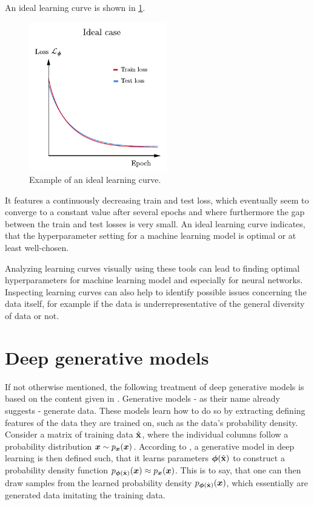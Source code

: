\documentclass[a4paper,11pt]{report}
\def\lk#1{{\color{black}{#1}}}
\begin{document}
An ideal learning curve is shown in \cref{fig:ideallearningcurve}.
\begin{figure}[h]
\centering
\includegraphics[width=6cm]{figures/ideallearningcurve.pdf}
\caption{Example of an ideal learning curve.}
\label{fig:ideallearningcurve}
\end{figure}
It features a continuously decreasing train and test loss, which eventually seem to converge to a constant value after several epochs and where furthermore the gap between the train and test losses is very small. An ideal learning curve indicates, that the hyperparameter setting for a machine learning model is optimal or at least well-chosen.

Analyzing learning curves visually using these tools can lead to finding optimal hyperparameters for machine learning model\lk{s} and especially for neural networks. Inspecting learning curves can also help to identify possible issues concerning the data itself, for example if the \lk{training or testing} data is underrepresentative of the general diversity of data or not.

\section{Deep generative models}
If not otherwise mentioned, the following treatment of deep generative models is based on the content given in \cite{weng2018flow}. Generative models - as their name already suggests - generate data. These models learn how to do so by extracting defining features of the data they are trained on, such as the data's probability density. Consider a matrix of training data $\hat{\boldsymbol{\mathbf{x}}}$, where the individual columns follow a probability distribution $\bm{x} \sim p_{\bm{x}}(\bm{x})$. According to \cite[p.593]{Raschka.2022}, a generative model in deep learning is then defined such, that it learns parameters $\bm{\phi}(\hat{\boldsymbol{\mathbf{x}}})$ to construct a probability density function $p_{\bm{\phi}(\hat{\boldsymbol{\mathbf{x}}})}(\bm{x}) \approx p_{\bm{x}}(\bm{x})$. This is to say, that one can then draw samples from the learned probability density $p_{\bm{\phi}(\hat{\boldsymbol{\mathbf{x}}})}(\bm{x})$, which essentially are generated data imitating the training data.
\end{document}
